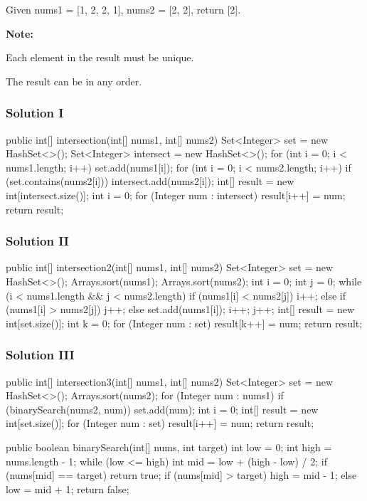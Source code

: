 Given nums1 = [1, 2, 2, 1], nums2 = [2, 2], return [2].

\textbf{Note:}

Each element in the result must be unique.

The result can be in any order.

\subsubsection{Solution I}

\begin{Code}
public int[] intersection(int[] nums1, int[] nums2) {
    Set<Integer> set = new HashSet<>();
    Set<Integer> intersect = new HashSet<>();
    for (int i = 0; i < nums1.length; i++) {
        set.add(nums1[i]);
    }
    for (int i = 0; i < nums2.length; i++) {
        if (set.contains(nums2[i])) {
            intersect.add(nums2[i]);
        }
    }
    int[] result = new int[intersect.size()];
    int i = 0;
    for (Integer num : intersect) {
        result[i++] = num;
    }
    return result;
}
\end{Code}

\newpage

\subsubsection{Solution II}
\begin{Code}
public int[] intersection2(int[] nums1, int[] nums2) {
    Set<Integer> set = new HashSet<>();
    Arrays.sort(nums1);
    Arrays.sort(nums2);
    int i = 0;
    int j = 0;
    while (i < nums1.length && j < nums2.length) {
        if (nums1[i] < nums2[j]) {
            i++;
        } else if (nums1[i] > nums2[j]) {
            j++;
        } else {
            set.add(nums1[i]);
            i++;
            j++;
        }
    }
    int[] result = new int[set.size()];
    int k = 0;
    for (Integer num : set) {
        result[k++] = num;
    }
    return result;
}
\end{Code}

\newpage
\subsubsection{Solution III}
\begin{Code}
public int[] intersection3(int[] nums1, int[] nums2) {
    Set<Integer> set = new HashSet<>();
    Arrays.sort(nums2);
    for (Integer num : nums1) {
        if (binarySearch(nums2, num)) {
            set.add(num);
        }
    }
    int i = 0;
    int[] result = new int[set.size()];
    for (Integer num : set) {
        result[i++] = num;
    }
    return result;
}

public boolean binarySearch(int[] nums, int target) {
    int low = 0;
    int high = nums.length - 1;
    while (low <= high) {
        int mid = low + (high - low) / 2;
        if (nums[mid] == target) {
            return true;
        }
        if (nums[mid] > target) {
            high = mid - 1;
        } else {
            low = mid + 1;
        }
    }
    return false;
}
\end{Code}

